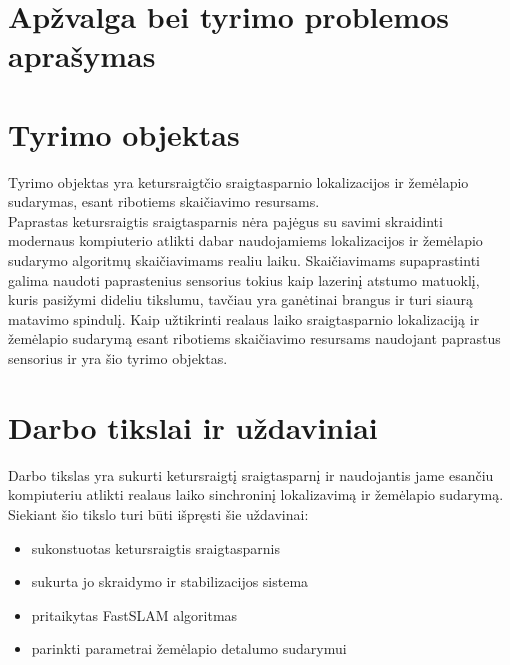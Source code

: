 \documentclass[a4paper, 12pt]{article} %
\begin{document}
\begin{onehalfspacing}

\section*{Ap\v{z}valga bei tyrimo problemos apra\v{s}ymas}

\section{Tyrimo objektas}

Tyrimo objektas yra ketursraigt\v{c}io sraigtasparnio lokalizacijos ir \v{z}em\.elapio sudarymas, esant ribotiems skai\v{c}iavimo resursams.
\\
\indent Paprastas ketursraigtis sraigtasparnis n\.era paj\.egus su savimi skraidinti modernaus kompiuterio atlikti dabar naudojamiems lokalizacijos ir \v{z}em\.elapio sudarymo algoritm\k{u} skai\v{c}iavimams realiu laiku. Skai\v{c}iavimams supaprastinti galima naudoti paprastenius sensorius tokius kaip lazerin\k{i} atstumo matuokl\k{i}, kuris pasi\v{z}ymi dideliu tikslumu, tav\v{c}iau yra gan\.{e}tinai brangus ir turi siaur\k{a} matavimo spindul\k{i}. Kaip u\v{z}tikrinti  realaus laiko sraigtasparnio lokalizacij\k{a} ir \v{z}em\.elapio sudarym\k{a} esant ribotiems skai\v{c}iavimo resursams naudojant paprastus sensorius ir yra \v{s}io tyrimo objektas. 

\section{Darbo tikslai ir u\v{z}daviniai}
Darbo tikslas yra sukurti ketursraigt\k{i} sraigtasparn\k{i} ir naudojantis jame esan\v{c}iu kompiuteriu atlikti realaus laiko sinchronin\k{i} lokalizavim\k{a} ir \v{z}em\.elapio sudarym\k{a}.
\\
\indent Siekiant \v{s}io tikslo turi b\=uti i\v{s}pr\k{e}sti \v{s}ie u\v{z}davinai:
\begin{itemize}
\item sukonstuotas ketursraigtis sraigtasparnis
\item sukurta jo skraidymo ir stabilizacijos sistema
\item pritaikytas FastSLAM algoritmas\cite{Zikos2011}
\item parinkti parametrai \v{z}em\.elapio detalumo sudarymui
\end{itemize}
     
  

\end{onehalfspacing}
\end{document}
